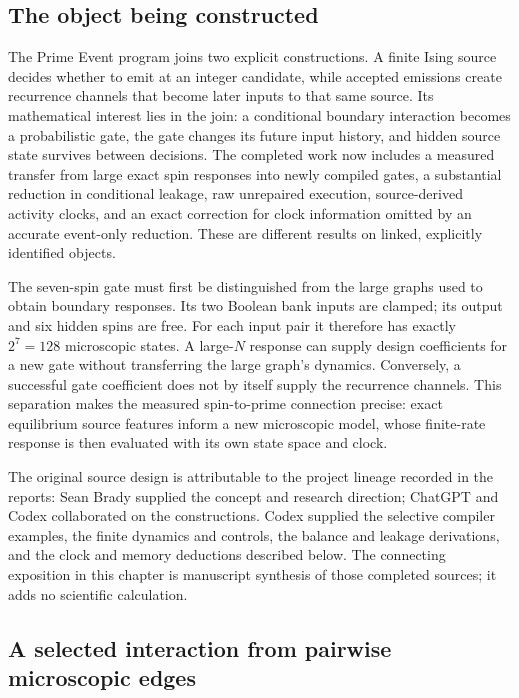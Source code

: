 \label{v3-prime-event}

\subsection{The object being constructed}

The Prime Event program joins two explicit constructions. A finite Ising source decides whether to emit at an integer candidate, while accepted emissions create recurrence channels that become later inputs to that same source. Its mathematical interest lies in the join: a conditional boundary interaction becomes a probabilistic gate, the gate changes its future input history, and hidden source state survives between decisions. The completed work now includes a measured transfer from large exact spin responses into newly compiled gates, a substantial reduction in conditional leakage, raw unrepaired execution, source-derived activity clocks, and an exact correction for clock information omitted by an accurate event-only reduction. These are different results on linked, explicitly identified objects.

The seven-spin gate must first be distinguished from the large graphs used to obtain boundary responses. Its two Boolean bank inputs are clamped; its output and six hidden spins are free. For each input pair it therefore has exactly $2^7=128$ microscopic states. A large-$N$ response can supply design coefficients for a new gate without transferring the large graph's dynamics. Conversely, a successful gate coefficient does not by itself supply the recurrence channels. This separation makes the measured spin-to-prime connection precise: exact equilibrium source features inform a new microscopic model, whose finite-rate response is then evaluated with its own state space and clock.

The original source design is attributable to the project lineage recorded in the reports: Sean Brady supplied the concept and research direction; ChatGPT and Codex collaborated on the constructions. Codex supplied the selective compiler examples, the finite dynamics and controls, the balance and leakage derivations, and the clock and memory deductions described below. The connecting exposition in this chapter is manuscript synthesis of those completed sources; it adds no scientific calculation.

\subsection{A selected interaction from pairwise microscopic edges}

